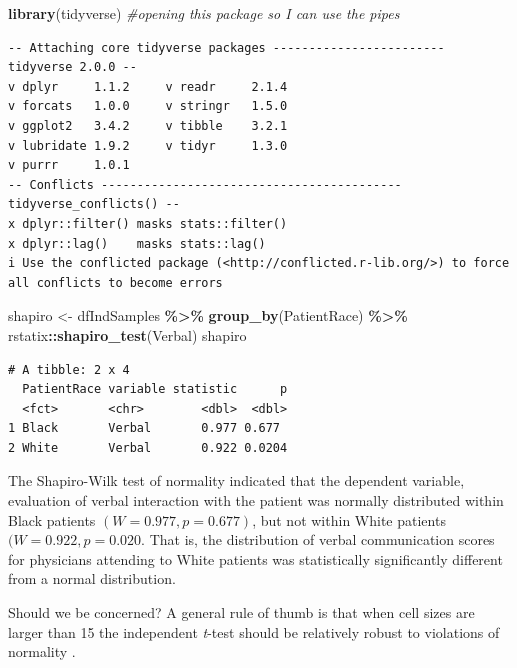 \documentclass[
  11pt,
]{book}
\newenvironment{Shaded}{\begin{snugshade}}{\end{snugshade}}
\newcommand{\CommentTok}[1]{\textcolor[rgb]{0.37,0.37,0.37}{\textit{#1}}}
\newcommand{\FunctionTok}[1]{\textcolor[rgb]{0.27,0.27,0.27}{\textbf{#1}}}
\newcommand{\NormalTok}[1]{#1}
\newcommand{\OtherTok}[1]{\textcolor[rgb]{0.37,0.37,0.37}{#1}}
\newcommand{\SpecialCharTok}[1]{\textcolor[rgb]{0.43,0.43,0.43}{\textbf{#1}}}
\begin{document}
\begin{Shaded}
\begin{Highlighting}[]
\FunctionTok{library}\NormalTok{(tidyverse)  }\CommentTok{\#opening this package so I can use the pipes}
\end{Highlighting}
\end{Shaded}

\begin{verbatim}
-- Attaching core tidyverse packages ------------------------ tidyverse 2.0.0 --
v dplyr     1.1.2     v readr     2.1.4
v forcats   1.0.0     v stringr   1.5.0
v ggplot2   3.4.2     v tibble    3.2.1
v lubridate 1.9.2     v tidyr     1.3.0
v purrr     1.0.1     
-- Conflicts ------------------------------------------ tidyverse_conflicts() --
x dplyr::filter() masks stats::filter()
x dplyr::lag()    masks stats::lag()
i Use the conflicted package (<http://conflicted.r-lib.org/>) to force all conflicts to become errors
\end{verbatim}

\begin{Shaded}
\begin{Highlighting}[]
\NormalTok{shapiro }\OtherTok{\textless{}{-}}\NormalTok{ dfIndSamples }\SpecialCharTok{\%\textgreater{}\%}
    \FunctionTok{group\_by}\NormalTok{(PatientRace) }\SpecialCharTok{\%\textgreater{}\%}
\NormalTok{    rstatix}\SpecialCharTok{::}\FunctionTok{shapiro\_test}\NormalTok{(Verbal)}
\NormalTok{shapiro}
\end{Highlighting}
\end{Shaded}

\begin{verbatim}
# A tibble: 2 x 4
  PatientRace variable statistic      p
  <fct>       <chr>        <dbl>  <dbl>
1 Black       Verbal       0.977 0.677 
2 White       Verbal       0.922 0.0204
\end{verbatim}

The Shapiro-Wilk test of normality indicated that the dependent variable, evaluation of verbal interaction with the patient was normally distributed within Black patients \((W = 0.977, p = 0.677)\), but not within White patients \((W = 0.922, p = 0.020\). That is, the distribution of verbal communication scores for physicians attending to White patients was statistically significantly different from a normal distribution.

Should we be concerned? A general rule of thumb is that when cell sizes are larger than 15 the independent \emph{t}-test should be relatively robust to violations of normality \citep{green_using_2017}.
\end{document}
